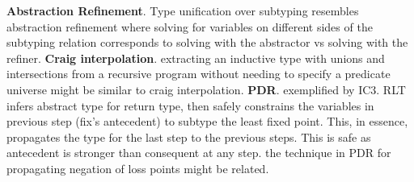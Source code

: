 \documentclass[letterpaper]{llncs}
\begin{document}
\textbf{Abstraction Refinement}. Type unification over subtyping resembles abstraction refinement  
where solving for variables on different sides of the subtyping relation corresponds to
solving with the abstractor vs solving with the refiner.
\newline
\textbf{Craig interpolation}. extracting an inductive type with unions and intersections 
from a recursive program without needing to specify a predicate universe might be similar to
craig interpolation. \newline
\textbf{PDR}. exemplified by IC3. RLT infers abstract type for return type, 
then safely constrains the variables in previous step (fix's antecedent) 
to subtype the least fixed point.
This, in essence, propagates the type for the last step to the previous steps.
This is safe as antecedent is stronger than consequent at any step.
the technique in PDR for propagating negation of loss points might be related. 
 \newline 
\end{document}

